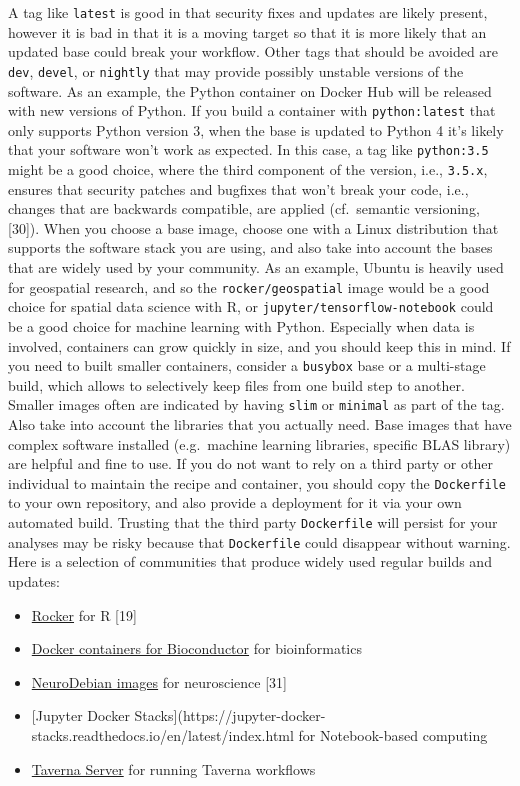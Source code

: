 \documentclass[10pt,letterpaper]{article}
\providecommand{\tightlist}{%
  \setlength{\itemsep}{0pt}\setlength{\parskip}{0pt}}
\begin{document}
A tag like \texttt{latest} is good in that security fixes and updates
are likely present, however it is bad in that it is a moving target so
that it is more likely that an updated base could break your workflow.
Other tags that should be avoided are \texttt{dev}, \texttt{devel}, or
\texttt{nightly} that may provide possibly unstable versions of the
software. As an example, the Python container on Docker Hub will be
released with new versions of Python. If you build a container with
\texttt{python:latest} that only supports Python version 3, when the
base is updated to Python 4 it's likely that your software won't work as
expected. In this case, a tag like \texttt{python:3.5} might be a good
choice, where the third component of the version, i.e., \texttt{3.5.x},
ensures that security patches and bugfixes that won't break your code,
i.e., changes that are backwards compatible, are applied (cf.~semantic
versioning, {[}30{]}). When you choose a base image, choose one with a
Linux distribution that supports the software stack you are using, and
also take into account the bases that are widely used by your community.
As an example, Ubuntu is heavily used for geospatial research, and so
the \texttt{rocker/geospatial} image would be a good choice for spatial
data science with R, or \texttt{jupyter/tensorflow-notebook} could be a
good choice for machine learning with Python. Especially when data is
involved, containers can grow quickly in size, and you should keep this
in mind. If you need to built smaller containers, consider a
\texttt{busybox} base or a multi-stage build, which allows to
selectively keep files from one build step to another. Smaller images
often are indicated by having \texttt{slim} or \texttt{minimal} as part
of the tag. Also take into account the libraries that you actually need.
Base images that have complex software installed (e.g.~machine learning
libraries, specific BLAS library) are helpful and fine to use. If you do
not want to rely on a third party or other individual to maintain the
recipe and container, you should copy the \texttt{Dockerfile} to your
own repository, and also provide a deployment for it via your own
automated build. Trusting that the third party \texttt{Dockerfile} will
persist for your analyses may be risky because that \texttt{Dockerfile}
could disappear without warning. Here is a selection of communities that
produce widely used regular builds and updates:

\begin{itemize}
\tightlist
\item
  \href{https://www.rocker-project.org/}{Rocker} for R {[}19{]}
\item
  \href{https://bioconductor.org/help/docker/}{Docker containers for
  Bioconductor} for bioinformatics
\item
  \href{https://hub.docker.com/_/neurodebian}{NeuroDebian images} for
  neuroscience {[}31{]}
\item
  {[}Jupyter Docker
  Stacks{]}(https://jupyter-docker-stacks.readthedocs.io/en/latest/index.html
  for Notebook-based computing
\item
  \href{https://hub.docker.com/r/taverna/taverna-server}{Taverna Server}
  for running Taverna workflows
\end{itemize}
\end{document}
